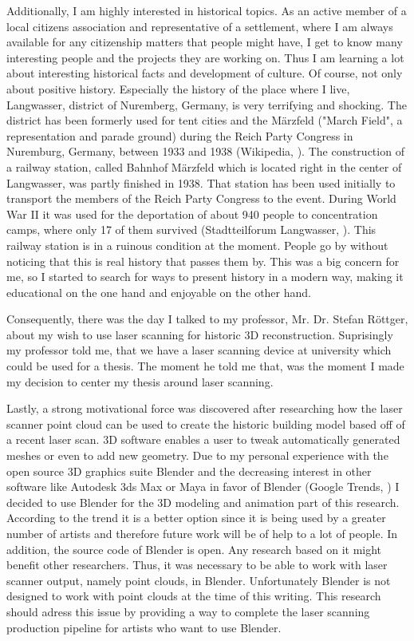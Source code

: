 Additionally, I am highly interested in historical topics. As an active member of a local citizens association and representative of a settlement, where I am always available for any citizenship matters that people might have, I get to know many interesting people and the projects they are working on. Thus I am learning a lot about interesting historical facts and development of culture. Of course, not only about positive history. Especially the history of the place where I live, Langwasser, district of Nuremberg, Germany, is very terrifying and shocking. The district has been formerly used for tent cities and the Märzfeld ("March Field", a representation and parade ground) during the Reich Party Congress in Nuremburg, Germany, between 1933 and 1938 (Wikipedia, \parencite{wiki:NaziPartyRallyGround}). The construction of a railway station, called Bahnhof Märzfeld which is located right in the center of Langwasser, was partly finished in 1938. That station has been used initially to transport the members of the Reich Party Congress to the event. During World War II it was used for the deportation of about 940 people to concentration camps, where only 17 of them survived (Stadtteilforum Langwasser, \parencite{StadtteilforumTafel6}). This railway station is in a ruinous condition at the moment. People go by without noticing that this is real history that passes them by. This was a big concern for me, so I started to search for ways to present history in a modern way, making it educational on the one hand and enjoyable on the other hand.

Consequently, there was the day I talked to my professor, Mr. Dr. Stefan Röttger, about my wish to use laser scanning for historic 3D reconstruction. Suprisingly my professor told me, that we have a laser scanning device at university which could be used for a thesis. The moment he told me that, was the moment I made my decision to center my thesis around laser scanning.

Lastly, a strong motivational force was discovered after researching how the laser scanner point cloud can be used to create the historic building model based off of a recent laser scan. 3D software enables a user to tweak automatically generated meshes or even to add new geometry. Due to my personal experience with the open source 3D graphics suite Blender and the decreasing interest in other software like Autodesk 3ds Max or Maya in favor of Blender (Google Trends, \parencite{Interest3DSoftware}) I decided to use Blender for the 3D modeling and animation part of this research. According to the trend it is a better option since it is being used by a greater number of artists and therefore future work will be of help to a lot of people. In addition, the source code of Blender is open. Any research based on it might benefit other researchers. Thus, it was necessary to be able to work with laser scanner output, namely point clouds, in Blender. Unfortunately Blender is not designed to work with point clouds at the time of this writing. This research should adress this issue by providing a way to complete the laser scanning production pipeline for artists who want to use Blender.

